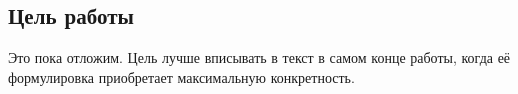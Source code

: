 \subsection{Цель работы}
Это пока отложим. Цель лучше вписывать в текст в самом конце работы, когда её формулировка приобретает максимальную конкретность.


